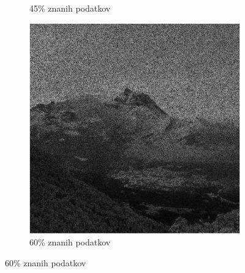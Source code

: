 \documentclass{beamer}
\begin{document}
\begin{frame}
\begin{figure}
\begin{subfigure}{0.325\linewidth}
      \caption{45\% znanih podatkov}
    \end{subfigure}
    \begin{subfigure}{0.325\linewidth}
      \includegraphics[width=\linewidth]{slike/vhod/slikaInput60.png}
      \caption{60\% znanih podatkov}
    \end{subfigure}
  \end{figure}
\end{frame}
\end{document}
